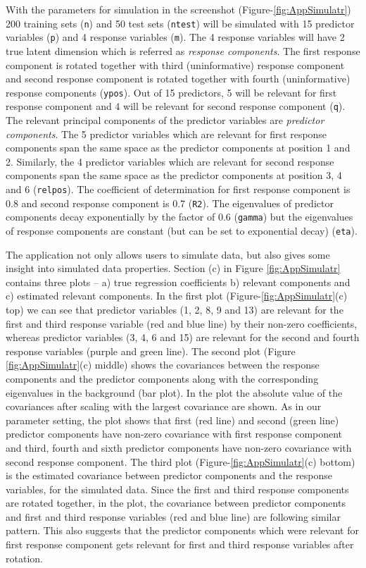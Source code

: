 \documentclass[review]{elsarticle}
\theoremstyle{definition}
\theoremstyle{definition}
\theoremstyle{definition}
\theoremstyle{remark}
\begin{document}
With the parameters for simulation in the screenshot
(Figure-\ref{fig:AppSimulatr}) 200 training sets (\texttt{n}) and 50
test sets (\texttt{ntest}) will be simulated with 15 predictor variables
(\texttt{p}) and 4 response variables (\texttt{m}). The 4 response
variables will have 2 true latent dimension which is referred as
\emph{response components}. The first response component is rotated
together with third (uninformative) response component and second
response component is rotated together with fourth (uninformative)
response components (\texttt{ypos}). Out of 15 predictors, 5 will be
relevant for first response component and 4 will be relevant for second
response component (\texttt{q}). The relevant principal components of
the predictor variables are \emph{predictor components}. The 5 predictor
variables which are relevant for first response components span the same
space as the predictor components at position 1 and 2. Similarly, the 4
predictor variables which are relevant for second response components
span the same space as the predictor components at position 3, 4 and 6
(\texttt{relpos}). The coefficient of determination for first response
component is 0.8 and second response component is 0.7 (\texttt{R2}). The
eigenvalues of predictor components decay exponentially by the factor of
0.6 (\texttt{gamma}) but the eigenvalues of response components are
constant (but can be set to exponential decay) (\texttt{eta}).

The application not only allows users to simulate data, but also gives
some insight into simulated data properties. Section (c) in Figure
\ref{fig:AppSimulatr} contains three plots -- a) true regression
coefficients b) relevant components and c) estimated relevant
components. In the first plot (Figure-\ref{fig:AppSimulatr}(c) top) we
can see that predictor variables (1, 2, 8, 9 and 13) are relevant for
the first and third response variable (red and blue line) by their
non-zero coefficients, whereas predictor variables (3, 4, 6 and 15) are
relevant for the second and fourth response variables (purple and green
line). The second plot (Figure \ref{fig:AppSimulatr}(c) middle) shows
the covariances between the response components and the predictor
components along with the corresponding eigenvalues in the background
(bar plot). In the plot the absolute value of the covariances after
scaling with the largest covariance are shown. As in our parameter
setting, the plot shows that first (red line) and second (green line)
predictor components have non-zero covariance with first response
component and third, fourth and sixth predictor components have non-zero
covariance with second response component. The third plot
(Figure-\ref{fig:AppSimulatr}(c) bottom) is the estimated covariance
between predictor components and the response variables, for the
simulated data. Since the first and third response components are
rotated together, in the plot, the covariance between predictor
components and first and third response variables (red and blue line)
are following similar pattern. This also suggests that the predictor
components which were relevant for first response component gets
relevant for first and third response variables after rotation.
\end{document}
